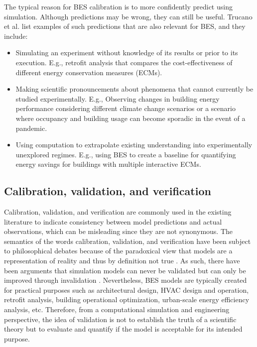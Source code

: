 \documentclass[review]{elsarticle}
\begin{document}
The typical reason for BES calibration is to more confidently predict using simulation. Although predictions may be wrong, they can still be useful. Trucano et al. \cite{trucano2006calibration} list examples of such predictions that are also relevant for BES, and they include: 
\begin{itemize}
    \item Simulating an experiment without knowledge of its results or prior to its execution. E.g., retrofit analysis that compares the cost-effectiveness of different energy conservation measures (ECMs).
    \item Making scientific pronouncements about phenomena that cannot currently be studied experimentally. E.g., Observing changes in building energy performance considering different climate change scenarios or a scenario where occupancy and building usage can become sporadic in the event of a pandemic.
    \item Using computation to extrapolate existing understanding into experimentally unexplored regimes. E.g., using BES to create a baseline for quantifying energy savings for buildings with multiple interactive ECMs.
\end{itemize}

\subsection{Calibration, validation, and verification}

Calibration, validation, and verification are commonly used in the existing literature to indicate consistency between model predictions and actual observations, which can be misleading since they are not synonymous. The semantics of the words calibration, validation, and verification have been subject to philosophical debates because of the paradoxical view that models are a representation of reality and thus by definition not true \cite{oreskes1994verification}. As such, there have been arguments that simulation models can never be validated but can only be improved through invalidation \cite{konikow1992ground}. Nevertheless, BES models are typically created for practical purposes such as architectural design, HVAC design and operation, retrofit analysis, building operational optimization, urban-scale energy efficiency analysis, etc. Therefore, from a computational simulation and engineering perspective, the idea of validation is not to establish the truth of a scientific theory but to evaluate and quantify if the model is acceptable for its intended purpose. 
\end{document}
